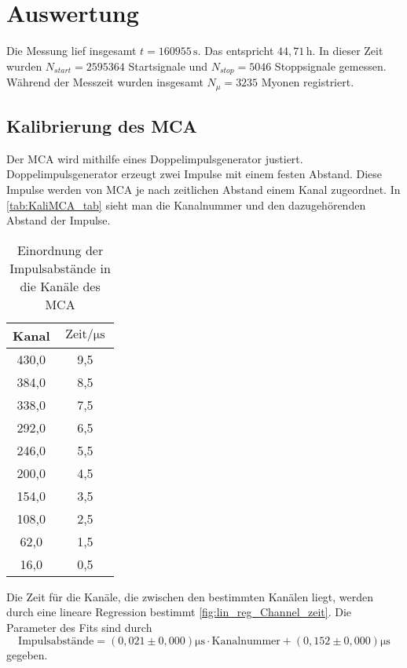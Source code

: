 \section{Auswertung}
\label{sec:auswertung}


Die Messung lief insgesamt $t = 160955 \, \unit{\second}$. Das entspricht $44,71 \, \unit{\hour}$. In dieser Zeit wurden $N_{start} = 2595364$ Startsignale und $N_{stop} = 5046$ Stoppsignale gemessen.
Während der Messzeit wurden insgesamt $N_{\mu} = 3235 $ Myonen registriert.

\subsection{Kalibrierung des MCA}
\label{sec:KaliMCA}

Der MCA wird mithilfe eines Doppelimpulsgenerator justiert. Doppelimpulsgenerator erzeugt zwei Impulse mit einem festen Abstand.
Diese Impulse werden von MCA je nach zeitlichen Abstand einem Kanal zugeordnet. In \autoref{tab:KaliMCA_tab} sieht man die Kanalnummer und den dazugehörenden Abstand der Impulse.

\begin{table}
    \centering
    \caption{Einordnung der Impulsabstände in die Kanäle des MCA}
    \label{tab:KaliMCA_tab}
    \begin{tabular}{c c}
    \toprule
     Kanal &  $\text{Zeit} \mathbin{/} \unit{\micro\second}$ \\
    \midrule
     430,0 &                             9,5 \\
     384,0 &                             8,5 \\
     338,0 &                             7,5 \\
     292,0 &                             6,5 \\
     246,0 &                             5,5 \\
     200,0 &                             4,5 \\
     154,0 &                             3,5 \\
     108,0 &                             2,5 \\
      62,0 &                             1,5 \\
      16,0 &                             0,5 \\
    \bottomrule
    \end{tabular}
    \end{table}

Die Zeit für die Kanäle, die zwischen den bestimmten Kanälen liegt, werden durch eine lineare Regression bestimmt \autoref{fig:lin_reg_Channel_zeit}.
Die Parameter des Fits sind durch 
\begin{equation*}
    \text{Impulsabstände} = \left(0,021 \pm 0,000 \right) \unit{\micro\second} \cdot  \text{Kanalnummer} + \left(0,152 \pm 0,000 \right) \unit{\micro\second}
    \label{eq:Kanal_Zeit_Rechnung}
\end{equation*}
gegeben.

